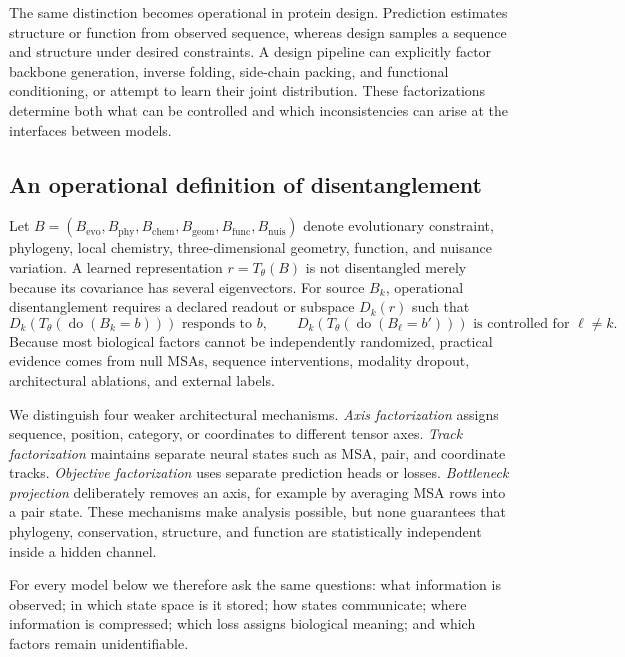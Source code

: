 \documentclass[10pt]{article}
\begin{document}
The same distinction becomes operational in protein design.  Prediction estimates structure or
function from observed sequence, whereas design samples a sequence and structure under desired
constraints.  A design pipeline can explicitly factor backbone generation, inverse folding,
side-chain packing, and functional conditioning, or attempt to learn their joint distribution.
These factorizations determine both what can be controlled and which inconsistencies can arise at
the interfaces between models.

\subsection{An operational definition of disentanglement}

Let $B=(B_{\mathrm{evo}},B_{\mathrm{phy}},B_{\mathrm{chem}},B_{\mathrm{geom}},
B_{\mathrm{func}},B_{\mathrm{nuis}})$ denote evolutionary constraint, phylogeny, local chemistry,
three-dimensional geometry, function, and nuisance variation.  A learned representation
$r=T_\theta(B)$ is not disentangled merely because its covariance has several eigenvectors.  For
source $B_k$, operational disentanglement requires a declared readout or subspace $D_k(r)$ such that
\begin{equation}
D_k\!\left(T_\theta(\operatorname{do}(B_k=b))\right)
\text{ responds to }b,
\qquad
D_k\!\left(T_\theta(\operatorname{do}(B_\ell=b'))\right)
\text{ is controlled for }\ell\ne k.
\label{eq:operational-disentanglement}
\end{equation}
Because most biological factors cannot be independently randomized, practical evidence comes from
null MSAs, sequence interventions, modality dropout, architectural ablations, and external labels.

We distinguish four weaker architectural mechanisms.  \emph{Axis factorization} assigns sequence,
position, category, or coordinates to different tensor axes.  \emph{Track factorization} maintains
separate neural states such as MSA, pair, and coordinate tracks.  \emph{Objective factorization}
uses separate prediction heads or losses.  \emph{Bottleneck projection} deliberately removes an
axis, for example by averaging MSA rows into a pair state.  These mechanisms make analysis possible,
but none guarantees that phylogeny, conservation, structure, and function are statistically
independent inside a hidden channel.

For every model below we therefore ask the same questions: what information is observed; in which
state space is it stored; how states communicate; where information is compressed; which loss
assigns biological meaning; and which factors remain unidentifiable.
\end{document}
